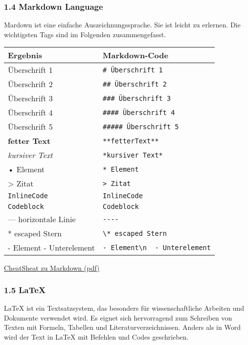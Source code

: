 \documentclass[
  11pt,
  a4paper,
  DIV=11,
  numbers=noendperiod]{scrartcl}
\begin{document}
\subsubsection{1.4 Markdown Language}\label{markdown-language}

Mardown ist eine einfache Auszeichnungssprache. Sie ist leicht zu
erlernen. Die wichtigsten Tags sind im Folgenden zusammengefasst.

\begin{longtable}[]{@{}ll@{}}
\toprule\noalign{}
Ergebnis & Markdown-Code \\
\midrule\noalign{}
\endhead
\bottomrule\noalign{}
\endlastfoot
Überschrift 1 & \texttt{\#\ Überschrift\ 1} \\
Überschrift 2 & \texttt{\#\#\ Überschrift\ 2} \\
Überschrift 3 & \texttt{\#\#\#\ Überschrift\ 3} \\
Überschrift 4 & \texttt{\#\#\#\#\ Überschrift\ 4} \\
Überschrift 5 & \texttt{\#\#\#\#\#\ Überschrift\ 5} \\
\textbf{fetter Text} & \texttt{**fetterText**} \\
\emph{kursiver Text} & \texttt{*kursiver\ Text*} \\
• Element & \texttt{*\ Element} \\
\textgreater{} Zitat & \texttt{\textgreater{}\ Zitat} \\
\texttt{InlineCode} &
\texttt{\textasciigrave{}InlineCode\textasciigrave{}} \\
\texttt{Codeblock} &
\texttt{\textasciigrave{}\textasciigrave{}\textasciigrave{}Codeblock\textasciigrave{}\textasciigrave{}\textasciigrave{}} \\
--- horizontale Linie & \texttt{-\/-\/-\/-} \\
* escaped Stern & \texttt{\textbackslash{}*\ escaped\ Stern} \\
- Element - Unterelement &
\texttt{-\ Element\textbackslash{}n\ \ -\ Unterelement} \\
\end{longtable}

\href{1_Programming_Introduction/1_Python_Programming/1-1_Setup/1-1_Markdown_CheatSheet.pdf}{CheatSheat
zu Markdown (pdf)}

\subsubsection{1.5 LaTeX}\label{latex}

LaTeX ist ein Textsatzsystem, das besonders für wissenschaftliche
Arbeiten und Dokumente verwendet wird. Es eignet sich hervorragend zum
Schreiben von Texten mit Formeln, Tabellen und Literaturverzeichnissen.
Anders als in Word wird der Text in LaTeX mit Befehlen und Codes
geschrieben.
\end{document}
